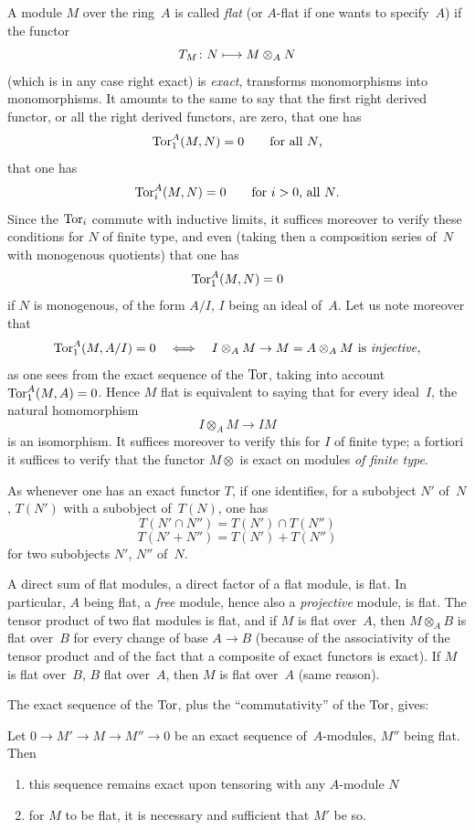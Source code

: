 A module $M$ over the ring~$A$ is called \emph{flat} (or $A$-flat if
one wants to specify~$A$)
if the functor
$$
T_M \colon N \mto M \otimes_{A}N
$$
(which is in any case right exact) is \emph{exact}, \ie transforms
monomorphisms into monomorphisms. It amounts to the same to say that
the first right derived functor, or all the right derived functors,
are zero, \ie that one has
$$
\operatorname{Tor}^{A}_{1}(M,N)=0 \qquad \text{for all $N$,}
$$
\resp that one has
$$
\operatorname{Tor}^{A}_{i}(M,N)=0 \qquad \text{for $i>0$, all $N$.}
$$
Since the $\operatorname{Tor}_{i}$ commute with inductive limits, it suffices
moreover to verify these conditions for $N$ of finite type, and even
(taking then a composition series of~$N$ with monogenous quotients)
that one has
$$
\operatorname{Tor}^{A}_{1}(M,N)=0
$$
if $N$ is monogenous, \ie of the form $A/I$, $I$ being an ideal
of~$A$. Let us note moreover that
$$
\operatorname{Tor}^{A}_{1}(M,A/I)=0 \quad\Longleftrightarrow\quad I\otimes_{A}M \rightarrow
M=A\otimes_{A}M\text{ is \emph{injective}},
$$
as one sees from the exact sequence of the $\operatorname{Tor}$, taking into account
$\operatorname{Tor}^{A}_{1}(M,A)=0$. Hence $M$ flat is equivalent to saying that for
every ideal~$I$, the natural homomorphism
$$
I\otimes_{A}M \to IM
$$
is an isomorphism. It suffices moreover to verify this for $I$ of
finite type; a fortiori it suffices to verify that the functor
$M\otimes$ is exact on modules \emph{of finite type}.

As whenever one has an exact functor $T$, if one identifies, for a
subobject $N'$ of~$N$, $T(N')$ with a subobject of~$T(N)$, one has
$$
T(N' \cap N'')=T(N') \cap T(N'')
$$
$$
T(N' + N'')=T(N') + T(N'')
$$
for two subobjects $N'$, $N''$ of~$N$.

A direct sum of flat modules, a direct factor of a flat module, is
flat. In particular, $A$ being flat, a \emph{free} module, hence also
a \emph{projective} module, is flat. The tensor product of two flat
modules is flat, and if $M$ is flat over~$A$, then $M\otimes_{A}B$ is
flat over~$B$ for every change of base $A \to B$ (because of the
associativity of the tensor product and of the fact that a composite
of
exact functors is exact). If $M$ is flat over~$B$, $B$ flat over~$A$,
then $M$ is flat over~$A$ (same reason).

The exact sequence of the $\operatorname{Tor}$, plus the ``commutativity'' of the
$\operatorname{Tor}$, gives:

\begin{proposition}
\label{IV.1.1}
Let $0 \to M' \to M \to M'' \to 0$ be an exact sequence of~$A$-modules,
$M''$ being flat. Then
\begin{enumerate}
\item[(i)] this sequence remains exact upon tensoring with any
$A$-module $N$
\item[(ii)] for $M$ to be flat, it is necessary and sufficient that
$M'$ be so.
\end{enumerate}
\end{proposition}

